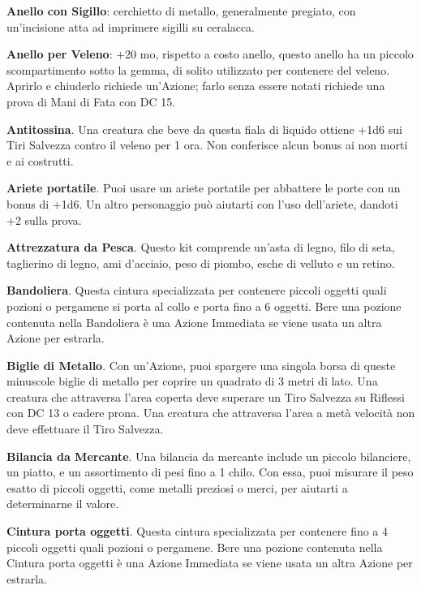 \begin{multicols}{2}
\textbf{Anello con Sigillo}: cerchietto di metallo, generalmente pregiato, con un'incisione atta ad imprimere sigilli su ceralacca.

\textbf{Anello per Veleno}\label{Anello per veleno}\hypertarget{Anello per veleno}{}: +20 mo, rispetto a costo anello, questo anello ha un piccolo scompartimento sotto la gemma, di solito utilizzato per contenere del veleno. Aprirlo e chiuderlo richiede un'Azione; farlo senza essere notati richiede una prova di Mani di Fata con DC 15.

\textbf{Antitossina}\label{Antitossina}\hypertarget{Antitossina}{}. Una creatura che beve da questa fiala di liquido ottiene +1d6 sui Tiri Salvezza contro il veleno per 1 ora. Non conferisce alcun bonus ai non morti e ai costrutti.

\textbf{Ariete portatile}\label{Ariete portatile}\hypertarget{Ariete portatile}{}. Puoi usare un ariete portatile per abbattere le porte con un bonus di +1d6. Un altro personaggio può aiutarti con l'uso dell'ariete, dandoti +2 sulla prova.

\textbf{Attrezzatura da Pesca}. Questo kit comprende un'asta di legno, filo di seta, taglierino di legno, ami d'acciaio, peso di piombo, esche di velluto e un retino.

\textbf{Bandoliera}\label{Bandoliera}\hypertarget{Bandoliera}{}. Questa cintura specializzata per contenere piccoli oggetti quali pozioni o pergamene si porta al collo e porta fino a 6 oggetti. Bere una pozione contenuta nella Bandoliera è una Azione Immediata se viene usata un altra Azione per estrarla.

\textbf{Biglie di Metallo}. Con un'Azione, puoi spargere una singola borsa di queste minuscole biglie di metallo per coprire un quadrato di 3 metri di lato. Una creatura che attraversa l'area coperta deve superare un Tiro Salvezza su Riflessi con DC 13 o cadere prona. Una creatura che attraversa l'area a metà velocità non deve effettuare il Tiro Salvezza.

\textbf{Bilancia da Mercante}. Una bilancia da mercante include un piccolo bilanciere, un piatto, e un assortimento di pesi fino a 1 chilo. Con essa, puoi misurare il peso esatto di piccoli oggetti, come metalli preziosi o merci, per aiutarti a determinarne il valore.

\textbf{Cintura porta oggetti}. Questa cintura specializzata per contenere fino a 4 piccoli oggetti quali pozioni o pergamene. Bere una pozione contenuta nella Cintura porta oggetti è una Azione Immediata se viene usata un altra Azione per estrarla.\label{Cintura porta oggetti}\hypertarget{Cintura porta oggetti}{}


\end{multicols}
